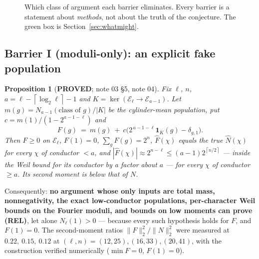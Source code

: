 \documentclass[10pt]{article}
\theoremstyle{plain}
\newtheorem{proposition}[theorem]{Proposition}
\theoremstyle{definition}
\newcommand{\E}{\mathcal E}
\newcommand{\ceil}[1]{\left\lceil #1\right\rceil}
\newcommand{\Prim}{\mathrm{Prim}}
\newcommand{\proved}{\textcolor{proved}{\textsf{\textbf{\footnotesize PROVED}}}}
\begin{document}
\begin{figure}[t]
\caption{Which class of argument each barrier eliminates. Every barrier is a
statement about \emph{methods}, not about the truth of the conjecture. The
green box is Section~\ref{sec:whatmight}.}
\label{fig:barriers}
\end{figure}

\subsection{Barrier I (moduli-only): an explicit fake population}\label{sec:bar1}

\begin{proposition}[\proved; note 03 \S5, note 04]\label{prop:bar1}
Fix $\ell$, $n$, $a=\ell-\ceil{\log_2\ell}-1$ and $K=\ker(\E_\ell\to\E_{a-1})$.
Let $m(g)=N_{a-1}(\text{class of }g)/|K|$ be the cylinder-mean population, put
$c=m(1)/(1-2^{a-1-\ell})$ and
\[
 F(g)\ =\ m(g)\ +\ c\bigl(2^{\,a-1-\ell}\mathbf 1_K(g)-\delta_{g,1}\bigr).
\]
Then $F\ge0$ on $\E_\ell$, $F(1)=0$, $\sum_g F(g)=2^n$, $\widehat F(\chi)$
equals the true $\widehat N(\chi)$ for every $\chi$ of conductor $<a$, and
$|\widehat F(\chi)|\approx2^{n-\ell}\le(a-1)2^{\ceil{n/2}}$ --- inside the Weil
bound for its conductor by a factor about $a$ --- for every $\chi$ of conductor
$\ge a$. Its second moment is \emph{below} that of $N$.
\end{proposition}

Consequently: \textbf{no argument whose only inputs are total mass,
nonnegativity, the exact low-conductor populations, per-character Weil bounds
on the Fourier moduli, and bounds on low moments can prove (REL)}, let alone
$N_\ell(1)>0$ --- because every such hypothesis holds for $F$, and $F(1)=0$.
The second-moment ratios $\|F\|_2^2/\|N\|_2^2$ were measured at
$0.22,\ 0.15,\ 0.12$ at $(\ell,n)=(12,25),(16,33),(20,41)$, with the
construction verified numerically ($\min F=0$, $F(1)=0$).
\end{document}
